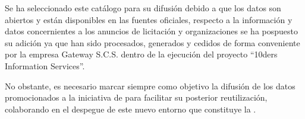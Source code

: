 Se ha seleccionado este catálogo para su difusión debido a que los datos son abiertos y están disponibles 
en las fuentes oficiales, respecto a la información y datos concernientes a los anuncios de licitación y organizaciones 
se ha pospuesto su adición ya que han sido procesados, generados y cedidos de forma conveniente por la empresa 
Gateway S.C.S. dentro de la ejecución del proyecto ``\gls{10ders} Information Services''.

No obstante, es necesario marcar siempre como objetivo la difusión de los datos promocionados a la iniciativa 
de \linkeddata para facilitar su posterior reutilización, colaborando en el despegue de este nuevo entorno 
que constituye la \wode.













